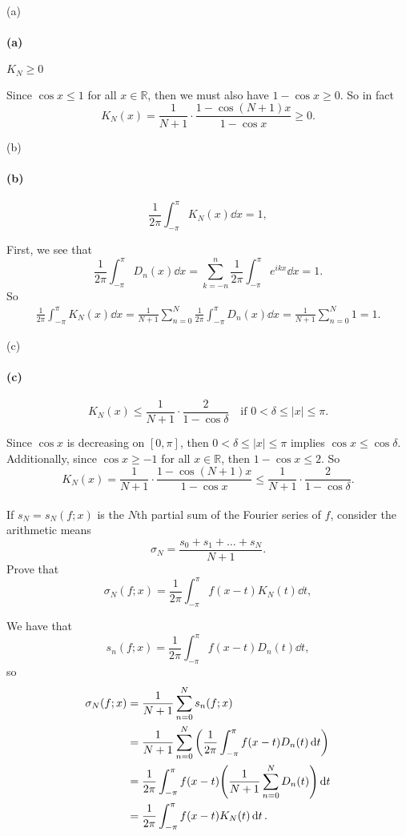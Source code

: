 \documentclass[12pt]{article}
\newenvironment{fullbox}{\begin{lrbox}{\savefullbox}\begin{minipage}{\dimexpr\textwidth-2\fboxsep\relax}}{\end{minipage}\end{lrbox}\begin{center}\framebox[\textwidth]{\usebox{\savefullbox}}\end{center}}
\newenvironment{pbox}[1][]{\begin{fullbox}\ifx#1\empty\else\paragraph{#1}\fi}{\end{fullbox}}
\theoremstyle{definition}
\newcommand{\R}{\mathbb{R}}
\begin{document}
\begin{pbox}[(a)]
    $K_N \geq 0$
\end{pbox}

Since $\cos x \leq 1$ for all $x \in \R$, then we must also have $1 - \cos x \geq 0$. So in fact
\[
    K_N(x) = \frac{1}{N + 1} \cdot \frac{1 - \cos(N + 1)x}{1 - \cos x} \geq 0.
\]


\newpage
\begin{pbox}[(b)]
    \[
        \frac{1}{2\pi} \int_{-\pi}^{\pi} K_N(x) \dd{x} = 1,
    \]
\end{pbox}

First, we see that
\[
    \frac{1}{2\pi} \int_{-\pi}^{\pi} D_n(x) \dd{x} 
        = \sum_{k=-n}^{n} \frac{1}{2\pi} \int_{-\pi}^{\pi} e^{ikx} \dd{x}
        = 1.
\]
So
\begin{align*}
    \frac{1}{2\pi} \int_{-\pi}^{\pi} K_N(x) \dd{x}
        = \frac{1}{N+1} \sum_{n=0}^{N} \frac{1}{2\pi} \int_{-\pi}^{\pi} D_n(x) \dd{x}
        = \frac{1}{N+1} \sum_{n=0}^{N} 1 
        = 1.
\end{align*}


\begin{pbox}[(c)]
    \[
        K_N(x) \leq \frac{1}{N + 1} \cdot \frac{2}{1 - \cos \delta} \quad \text{if } 0 < \delta \leq |x| \leq \pi.
    \]
\end{pbox}

Since $\cos x$ is decreasing on $[0, \pi]$, then $0 < \delta \leq |x| \leq \pi$ implies $\cos x \leq \cos\delta$. Additionally, since $\cos x \geq - 1$ for all $x \in \R$, then $1 - \cos x \leq 2$. So
\[
    K_N(x)
        = \frac{1}{N+1} \cdot \frac{1 - \cos(N + 1)x}{1 - \cos x}
        \leq \frac{1}{N+1} \cdot \frac{2}{1 - \cos \delta}.
\]

\begin{pbox}
    If $s_N = s_N(f; x)$ is the $N$th partial sum of the Fourier series of $f$, consider the arithmetic means
    \[
        \sigma_N = \frac{s_0 + s_1 + \dots + s_N}{N + 1}.
    \]
    Prove that
    \[
        \sigma_N(f; x) = \frac{1}{2\pi} \int_{-\pi}^{\pi} f(x-t)K_N(t) \dd{t},
    \]
\end{pbox}

We have that
\[
    s_n(f; x) = \frac{1}{2\pi} \int_{-\pi}^{\pi} f(x - t) D_n(t) \dd{t}, 
\]
so
\begin{align*}
    \sigma_N(f; x)
        &= \frac{1}{N+1} \sum_{n=0}^{N} s_n(f; x) \\
        &= \frac{1}{N+1} \sum_{n=0}^{N} \qty(\frac{1}{2\pi} \int_{-\pi}^{\pi} f(x - t) D_n(t) \dd{t}) \\
        &= \frac{1}{2\pi} \int_{-\pi}^{\pi} f(x - t) \qty(\frac{1}{N+1} \sum_{n=0}^{N} D_n(t)) \dd{t} \\
        &= \frac{1}{2\pi} \int_{-\pi}^{\pi} f(x - t) K_N(t) \dd{t}.
\end{align*}
\end{document}
